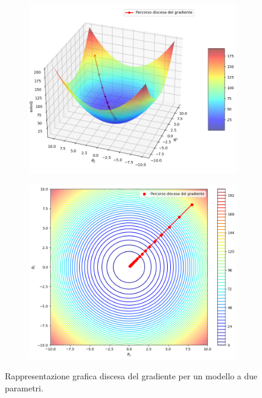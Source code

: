 \documentclass[12pt,a4paper,twoside,openright]{book}
\begin{document}
\begin{figure}[H]
    \centering
    \begin{subfigure}[b]{0.48\textwidth}
        \includegraphics[width=\textwidth]{images/gradiente.png}
    \end{subfigure}
\quad
    \begin{subfigure}[b]{0.48\textwidth}
        \includegraphics[width=\textwidth]{images/gradiente2.png}
    \end{subfigure}
    \caption{Rappresentazione grafica discesa del gradiente per un modello a due parametri.}
    \label{fig:grad-descent}
\end{figure}
\end{document}
